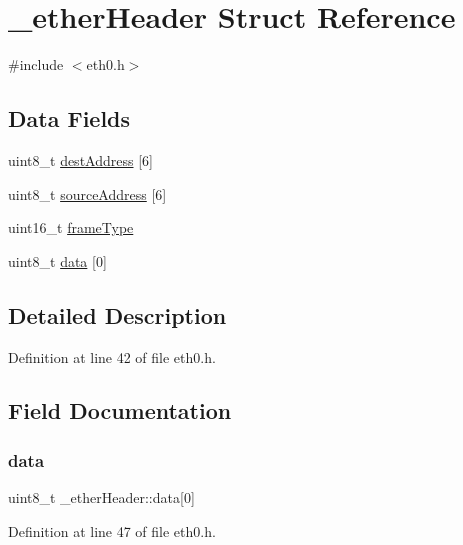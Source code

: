 \hypertarget{struct__etherHeader}{}\section{\+\_\+ether\+Header Struct Reference}
\label{struct__etherHeader}


{\ttfamily \#include $<$eth0.\+h$>$}

\subsection*{Data Fields}
\begin{DoxyCompactItemize}
\item 
uint8\+\_\+t \hyperlink{struct__etherHeader_a92143e6946b3c56fcbbc1713a8afa7e0}{dest\+Address} \mbox{[}6\mbox{]}
\item 
uint8\+\_\+t \hyperlink{struct__etherHeader_a20b851de2e0073e9d27776edbd3e75c5}{source\+Address} \mbox{[}6\mbox{]}
\item 
uint16\+\_\+t \hyperlink{struct__etherHeader_a2b501a1791fcbfa944fe6f696e874f95}{frame\+Type}
\item 
uint8\+\_\+t \hyperlink{struct__etherHeader_af31a6161fbb6364ac4a0c5c158d42dec}{data} \mbox{[}0\mbox{]}
\end{DoxyCompactItemize}


\subsection{Detailed Description}


Definition at line 42 of file eth0.\+h.



\subsection{Field Documentation}
\mbox{\label{struct__etherHeader_af31a6161fbb6364ac4a0c5c158d42dec}} 
\subsubsection{\texorpdfstring{data}{data}}
{\footnotesize\ttfamily uint8\+\_\+t \+\_\+ether\+Header\+::data\mbox{[}0\mbox{]}}



Definition at line 47 of file eth0.\+h.

